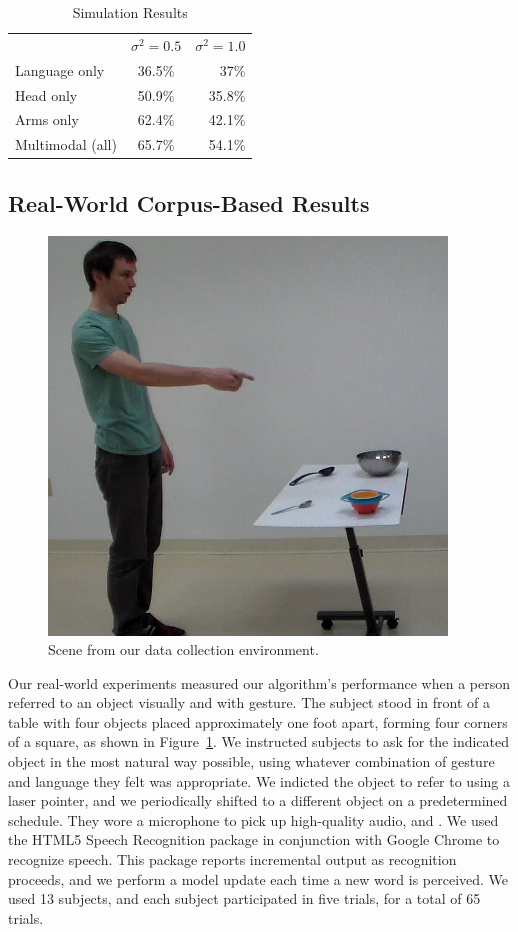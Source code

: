 \documentclass[letterpaper, 10 pt, conference]{ieeeconf}
\begin{document}
\begin{table}
\centering
\caption{Simulation Results\label{table:sim_results}}
\begin{tabular}{lcr}
\toprule
& $\sigma^2 = 0.5$ & $\sigma^2 = 1.0$\\
Language only &  36.5\% & 37\%\\
Head only & 50.9\% & 35.8\%\\
Arms only & 62.4\% & 42.1\%\\
Multimodal (all)&  65.7\% & 54.1\%\\
\bottomrule
\end{tabular}
\end{table}

\subsection{Real-World Corpus-Based Results}

\begin{figure}
\centering
\includegraphics[width=0.5\linewidth]{figures/dataset.png}
\caption{Scene from our data collection environment.\label{fig:corpus_scene}}
\end{figure}

Our real-world experiments measured our algorithm's performance when a
person referred to an object visually and with gesture.  The subject
stood in front of a table with four objects placed approximately one
foot apart, forming four corners of a square, as shown in
Figure~\ref{fig:corpus_scene}.  We instructed subjects to ask for the
indicated object in the most natural way possible, using whatever
combination of gesture and language they felt was appropriate. We
indicted the object to refer to using a laser pointer, and we
periodically shifted to a different object on a predetermined
schedule.  They wore a microphone to pick up high-quality audio, and
.  We
used the HTML5 Speech Recognition package in conjunction with Google
Chrome to recognize speech.  This package reports incremental output
as recognition proceeds, and we perform a model update each time a new
word is perceived.  We used 13 subjects, and each subject participated
in five trials, for a total of 65 trials.
\end{document}
